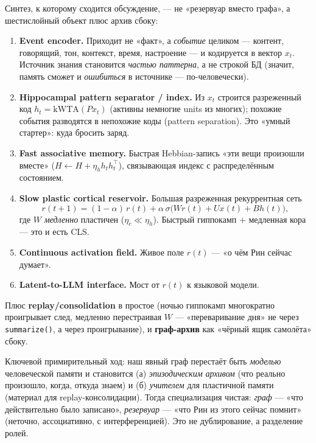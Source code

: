 Синтез, к которому сходится обсуждение, — не «резервуар вместо графа», а шестислойный объект
плюс архив сбоку:
\begin{enumerate}\itemsep2pt
\item \textbf{Event encoder.} Приходит не «факт», а \emph{событие} целиком — контент, говорящий,
тон, контекст, время, настроение — и кодируется в вектор $x_t$. Источник знания становится
\emph{частью паттерна}, а не строкой БД (значит, память сможет и \emph{ошибиться} в источнике
— по-человечески).
\item \textbf{Hippocampal pattern separator / index.} Из $x_t$ строится разреженный код
$h_t=\mathrm{kWTA}(Px_t)$ (активны немногие units из многих); похожие события разводятся в
непохожие коды (pattern separation). Это «умный стартер»: куда бросить заряд.
\item \textbf{Fast associative memory.} Быстрая Hebbian-запись «эти вещи произошли вместе»
($H\!\leftarrow\!H+\eta_h h_t h_t^\top$), связывающая индекс с распределённым состоянием.
\item \textbf{Slow plastic cortical reservoir.} Большая разреженная рекуррентная сеть
\[
r(t{+}1)=(1-\alpha)\,r(t)+\alpha\,\sigma\!\big(Wr(t)+Ux(t)+Bh(t)\big),
\]
где $W$ \emph{медленно} пластичен ($\eta_c\ll\eta_h$). Быстрый гиппокамп $+$ медленная кора —
это и есть CLS.
\item \textbf{Continuous activation field.} Живое поле $r(t)$ — «о чём Рин сейчас думает».
\item \textbf{Latent-to-LLM interface.} Мост от $r(t)$ к языковой модели.
\end{enumerate}
Плюс \textbf{replay/consolidation} в простое (ночью гиппокамп многократно проигрывает след,
медленно перестраивая $W$ — «переваривание дня» не через \texttt{summarize()}, а через
проигрывание), и \textbf{граф-архив} как «чёрный ящик самолёта» сбоку.

\begin{principle}
Ключевой примирительный ход: наш явный граф перестаёт быть \emph{моделью} человеческой памяти
и становится (а) \emph{эпизодическим архивом} (что реально произошло, когда, откуда знаем) и
(б) \emph{учителем} для пластичной памяти (материал для replay-консолидации). Тогда
специализация чистая: \emph{граф} — «что действительно было записано», \emph{резервуар} — «что
Рин из этого сейчас помнит» (неточно, ассоциативно, с интерференцией). Это не дублирование, а
разделение ролей.
\end{principle}

